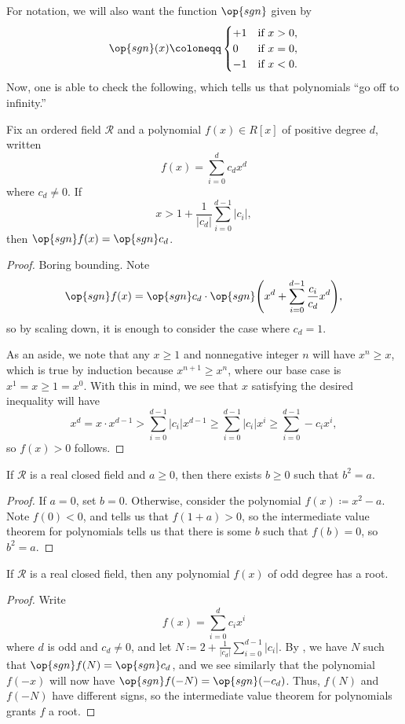 \documentclass[../notes.tex]{subfiles}
\begin{document}
For notation, we will also want the function $\op{sgn}$ given by
\[\op{sgn}(x)\coloneqq\begin{cases}
	+1 & \text{if }x>0, \\
	0 & \text{if }x=0, \\
	-1 & \text{if }x<0.
\end{cases}\]
Now, one is able to check the following, which tells us that polynomials ``go off to infinity.''
\begin{proposition} \label{prop:off-to-infinity}
	Fix an ordered field $\mathcal R$ and a polynomial $f(x)\in R[x]$ of positive degree $d$, written
	\[f(x)=\sum_{i=0}^dc_dx^d\]
	where $c_d\ne0$. If
	\[x>1+\frac1{\left|c_d\right|}\sum_{i=0}^{d-1}\left|c_i\right|,\]
	then $\op{sgn}f(x)=\op{sgn}c_d$.
\end{proposition}
\begin{proof}
	Boring bounding. Note
	\[\op{sgn}f(x)=\op{sgn}c_d\cdot\op{sgn}\Bigg(x^d+\sum_{i=0}^{d-1}\frac{c_i}{c_d}x^d\Bigg),\]
	so by scaling down, it is enough to consider the case where $c_d=1$.

	As an aside, we note that any $x\ge1$ and nonnegative integer $n$ will have $x^n\ge x$, which is true by induction because $x^{n+1}\ge x^n$, where our base case is $x^1=x\ge 1=x^0$. With this in mind, we see that $x$ satisfying the desired inequality will have
	\[x^d=x\cdot x^{d-1}>\sum_{i=0}^{d-1}\left|c_i\right|x^{d-1}\ge\sum_{i=0}^{d-1}\left|c_i\right|x^i\ge\sum_{i=0}^{d-1}-c_ix^i,\]
	so $f(x)>0$ follows.
\end{proof}
\begin{corollary}
	If $\mathcal R$ is a real closed field and $a\ge0$, then there exists $b\ge0$ such that $b^2=a$.
\end{corollary}
\begin{proof}
	If $a=0$, set $b=0$. Otherwise, consider the polynomial $f(x)\coloneqq x^2-a$. Note $f(0)<0$, and  tells us that $f(1+a)>0$, so the intermediate value theorem for polynomials tells us that there is some $b$ such that $f(b)=0$, so $b^2=a$.
\end{proof}
\begin{corollary}
	If $\mathcal R$ is a real closed field, then any polynomial $f(x)$ of odd degree has a root.
\end{corollary}
\begin{proof}
	Write
	\[f(x)=\sum_{i=0}^dc_ix^i\]
	where $d$ is odd and $c_d\ne0$, and let $N\coloneqq2+\frac1{\left|c_d\right|}\sum_{i=0}^{d-1}\left|c_i\right|$. By , we have $N$ such that $\op{sgn}f(N)=\op{sgn}c_d$, and we see similarly that the polynomial $f(-x)$ will now have $\op{sgn}f(-N)=\op{sgn}(-c_d)$. Thus, $f(N)$ and $f(-N)$ have different signs, so the intermediate value theorem for polynomials grants $f$ a root.
\end{proof}
\end{document}
